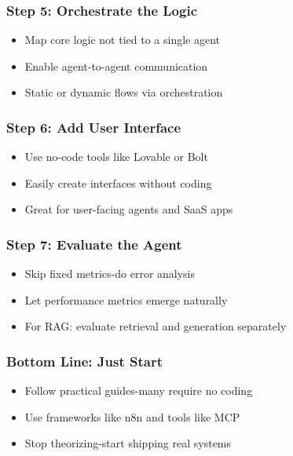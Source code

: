 \begin{frame}[fragile]\frametitle{Step 5: Orchestrate the Logic}
      \begin{itemize}
        \item Map core logic not tied to a single agent
        \item Enable agent-to-agent communication
        \item Static or dynamic flows via orchestration
      \end{itemize}
\end{frame}

\begin{frame}[fragile]\frametitle{Step 6: Add User Interface}
      \begin{itemize}
        \item Use no-code tools like Lovable or Bolt
        \item Easily create interfaces without coding
        \item Great for user-facing agents and SaaS apps
      \end{itemize}
\end{frame}

\begin{frame}[fragile]\frametitle{Step 7: Evaluate the Agent}
      \begin{itemize}
        \item Skip fixed metrics-do error analysis
        \item Let performance metrics emerge naturally
        \item For RAG: evaluate retrieval and generation separately
      \end{itemize}
\end{frame}

\begin{frame}[fragile]\frametitle{Bottom Line: Just Start}
      \begin{itemize}
        \item Follow practical guides-many require no coding
        \item Use frameworks like n8n and tools like MCP
        \item Stop theorizing-start shipping real systems
      \end{itemize}
\end{frame}


